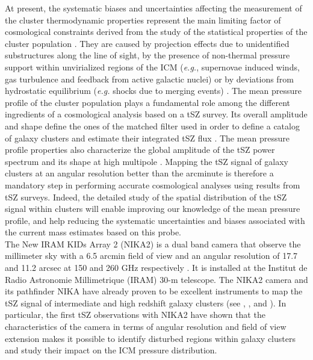 \documentclass[twocolumn,traditabstract]{aa}
\begin{document}
\indent At present, the systematic biases and uncertainties affecting the measurement of the cluster thermodynamic properties represent the main limiting factor of cosmological constraints derived from the study of the statistical properties of the cluster population \citep[\emph{e.g.}][]{sal18}. They are caused by projection effects due to unidentified substructures along the line of sight, by the presence of non-thermal pressure support within unvirialized regions of the ICM (\emph{e.g.}, supernovae induced winds, gas turbulence and feedback from active galactic nuclei) or by deviations from hydrostatic equilibrium (\emph{e.g.} shocks due to merging events) \citep[see][for a review]{mro18}. The mean pressure profile of the cluster population plays a fundamental role among the different ingredients of a cosmological analysis based on a tSZ survey. Its overall amplitude and shape define the ones of the matched filter used in order to define a catalog of galaxy clusters and estimate their integrated tSZ flux \citep[\emph{e.g.}][]{mel06}. The mean pressure profile properties also characterize the global amplitude of the tSZ power spectrum and its shape at high multipole \citep[\emph{e.g.}][]{bol18}. Mapping the tSZ signal of galaxy clusters at an angular resolution better than the arcminute is therefore a mandatory step in performing accurate cosmological analyses using results from tSZ surveys. Indeed, the detailed study of the spatial distribution of the tSZ signal within clusters will enable improving our knowledge of the mean pressure profile, and help reducing the systematic uncertainties and biases associated with the current mass estimates based on this probe.\\
\indent The New IRAM KIDs Array 2 (NIKA2) is a dual band camera that observe the millimeter sky with a 6.5 arcmin field of view and an angular resolution of 17.7 and 11.2 arcsec at 150 and 260 GHz respectively \citep[see][]{ada18}. It is installed at the Institut de Radio Astronomie Millimetrique (IRAM) 30-m telescope. The NIKA2 camera and its pathfinder NIKA have already proven to be excellent instruments to map the tSZ signal of intermediate and high redshift galaxy clusters (see \citealt{ada14,ada15,ada16a,ada17a,ada17b}, \citealt{rup17}, and \citealt{rom17}). In particular, the first tSZ observations with NIKA2 \citep{rup18} have shown that the characteristics of the camera in terms of angular resolution and field of view extension makes it possible to identify disturbed regions within galaxy clusters and study their impact on the ICM pressure distribution.\\
\end{document}
